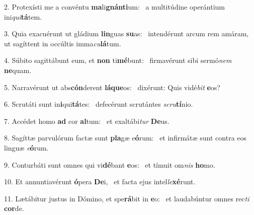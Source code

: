 2. Protexísti me a convéntu \textbf{ma}li\textbf{gnán}\textbf{ti}um: \ast\  a multitúdine operántium ini\textit{qui}\textbf{tá}tem.\

3. Quia exacuérunt ut gládium \textbf{lin}guas \textbf{su}as: \ast\  intendérunt arcum rem amáram, ut sagíttent in occúltis imma\textit{cu}\textbf{lá}tum.\

4. Súbito sagittábunt eum, et \textbf{non} ti\textbf{mé}bunt: \ast\  firmavérunt sibi sermó\textit{nem} \textbf{ne}quam.\

5. Narravérunt ut abs\textbf{cón}derent \textbf{lá}\textbf{que}os: \ast\  dixérunt: Quis vidé\textit{bit} \textbf{e}os?\

6. Scrutáti sunt in\textbf{i}qui\textbf{tá}tes: \ast\  defecérunt scrutántes \textit{scru}\textbf{tí}nio.\

7. Accédet homo \textbf{ad} cor \textbf{al}tum: \ast\  et exaltábi\textit{tur} \textbf{De}us.\

8. Sagíttæ parvulórum factæ sunt \textbf{pla}gæ e\textbf{ó}rum: \ast\  et infirmátæ sunt contra eos linguæ \textit{e}\textbf{ó}rum.\

9. Conturbáti sunt omnes qui vi\textbf{dé}bant \textbf{e}os: \ast\  et tímuit om\textit{nis} \textbf{ho}mo.\

10. Et annuntiavérunt \textbf{ó}pera \textbf{De}i, \ast\  et facta ejus intel\textit{le}\textbf{xé}runt.\

11. Lætábitur justus in Dómino, et spe\textbf{rá}bit in \textbf{e}o: \ast\  et laudabúntur omnes rec\textit{ti} \textbf{cor}de.\

